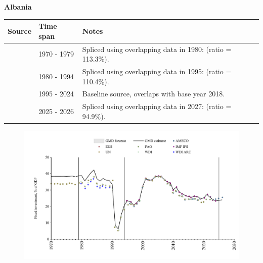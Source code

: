 \documentclass[12pt,a4paper,landscape]{article}
\begin{document}
\begin{adjustbox}{max totalsize={\paperwidth}{\paperheight},center}
\begin{minipage}[t][\textheight][t]{\textwidth}
\vspace*{0.5cm}
{}
\begin{center}
{\Large\bfseries Albania}
\end{center}
\vspace{0.5cm}
\begin{table}[H]
\centering
\small
\begin{tabular}{|l|l|l|}
\hline
\textbf{Source} & \textbf{Time span} & \textbf{Notes} \\
\hline
\rowcolor{white}\cite{UN}& 1970 - 1979 &Spliced using overlapping data in 1980: (ratio = 113.3\%).\\
\rowcolor{lightgray}\cite{WDI}& 1980 - 1994 &Spliced using overlapping data in 1995: (ratio = 110.4\%).\\
\rowcolor{white}\cite{EUS}& 1995 - 2024 &Baseline source, overlaps with base year 2018.\\
\rowcolor{lightgray}\cite{AMECO}& 2025 - 2026 &Spliced using overlapping data in 2027: (ratio = 94.9\%).\\
\hline
\end{tabular}
\end{table}
\begin{figure}[H]
\centering
\includegraphics[width=\textwidth,height=0.6\textheight,keepaspectratio]{graphs/ALB_finv_GDP.pdf}
\end{figure}
\end{minipage}
\end{adjustbox}
\end{document}
